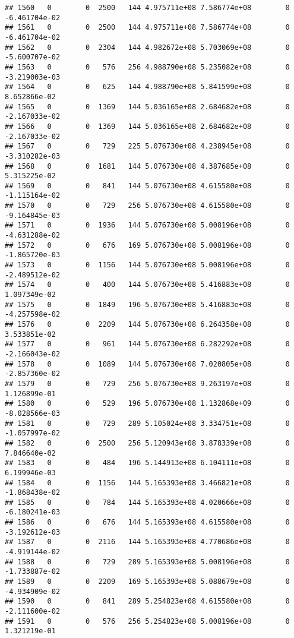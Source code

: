\documentclass[
]{article}
\begin{document}
\begin{enumerate}
\begin{verbatim}
## 1560   0        0  2500   144 4.975711e+08 7.586774e+08        0 -6.461704e-02
## 1561   0        0  2500   144 4.975711e+08 7.586774e+08        0 -6.461704e-02
## 1562   0        0  2304   144 4.982672e+08 5.703069e+08        0 -5.600707e-02
## 1563   0        0   576   256 4.988790e+08 5.235082e+08        0 -3.219003e-03
## 1564   0        0   625   144 4.988790e+08 5.841599e+08        0  8.652866e-02
## 1565   0        0  1369   144 5.036165e+08 2.684682e+08        0 -2.167033e-02
## 1566   0        0  1369   144 5.036165e+08 2.684682e+08        0 -2.167033e-02
## 1567   0        0   729   225 5.076730e+08 4.238945e+08        0 -3.310282e-03
## 1568   0        0  1681   144 5.076730e+08 4.387685e+08        0  5.315225e-02
## 1569   0        0   841   144 5.076730e+08 4.615580e+08        0 -1.115164e-02
## 1570   0        0   729   256 5.076730e+08 4.615580e+08        0 -9.164845e-03
## 1571   0        0  1936   144 5.076730e+08 5.008196e+08        0 -4.631288e-02
## 1572   0        0   676   169 5.076730e+08 5.008196e+08        0 -1.865720e-03
## 1573   0        0  1156   144 5.076730e+08 5.008196e+08        0 -2.489512e-02
## 1574   0        0   400   144 5.076730e+08 5.416883e+08        0  1.097349e-02
## 1575   0        0  1849   196 5.076730e+08 5.416883e+08        0 -4.257598e-02
## 1576   0        0  2209   144 5.076730e+08 6.264358e+08        0  3.533851e-02
## 1577   0        0   961   144 5.076730e+08 6.282292e+08        0 -2.166043e-02
## 1578   0        0  1089   144 5.076730e+08 7.020805e+08        0 -2.857360e-02
## 1579   0        0   729   256 5.076730e+08 9.263197e+08        0  1.126899e-01
## 1580   0        0   529   196 5.076730e+08 1.132868e+09        0 -8.028566e-03
## 1581   0        0   729   289 5.105024e+08 3.334751e+08        0 -1.057997e-02
## 1582   0        0  2500   256 5.120943e+08 3.878339e+08        0  7.846640e-02
## 1583   0        0   484   196 5.144913e+08 6.104111e+08        0  6.199946e-03
## 1584   0        0  1156   144 5.165393e+08 3.466821e+08        0 -1.868438e-02
## 1585   0        0   784   144 5.165393e+08 4.020666e+08        0 -6.180241e-03
## 1586   0        0   676   144 5.165393e+08 4.615580e+08        0 -3.192612e-03
## 1587   0        0  2116   144 5.165393e+08 4.770686e+08        0 -4.919144e-02
## 1588   0        0   729   289 5.165393e+08 5.008196e+08        0 -1.733887e-02
## 1589   0        0  2209   169 5.165393e+08 5.088679e+08        0 -4.934909e-02
## 1590   0        0   841   289 5.254823e+08 4.615580e+08        0 -2.111600e-02
## 1591   0        0   576   256 5.254823e+08 5.008196e+08        0  1.321219e-01

\end{verbatim}
\end{enumerate}
\end{document}
